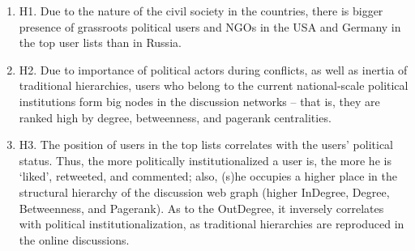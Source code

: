 \begin{enumerate}
	\item H1. Due to the nature of the civil society in the countries, there is bigger presence of grassroots political users and NGOs in the USA and Germany in the top user lists than in Russia.
	
	\item H2. Due to importance of political actors during conflicts, as well as inertia of traditional hierarchies, users who belong to the current national-scale political institutions form big nodes in the discussion networks -- that is, they are ranked high by degree, betweenness, and pagerank centralities.
	
	\item H3. The position of users in the top lists correlates with the users’ political status. Thus, the more politically institutionalized a user is, the more he is ‘liked’, retweeted, and commented; also, (s)he occupies a higher place in the structural hierarchy of the discussion web graph (higher InDegree, Degree, Betweenness, and Pagerank). As to the OutDegree, it inversely correlates with political institutionalization, as traditional hierarchies are reproduced in the online discussions.
\end{enumerate}

